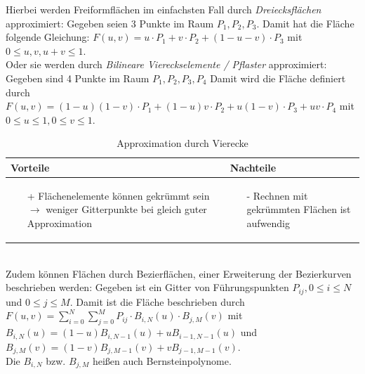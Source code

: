 Hierbei werden Freiformflächen im einfachsten Fall durch \textit{Dreiecksflächen} approximiert:
Gegeben seien 3 Punkte im Raum $P_1 , P_2 , P_3$. Damit hat die Fläche folgende Gleichung:
$F(u,v)=u\cdot P_1 +v\cdot P_2 +(1-u-v)\cdot P_3$ mit $0 \leq u,v, u+v \leq 1$.\\
Oder sie werden durch \textit{Bilineare Viereckselemente / Pflaster} approximiert:
Gegeben sind 4 Punkte im Raum $P_1 , P_2 , P_3, P_4$
Damit wird die Fläche definiert durch $F(u,v)=(1-u)(1-v) \cdot P_1 + (1-u)v \cdot P_2 + u(1-v) \cdot P_3 + uv \cdot P_4$ mit $0 \leq u \leq 1, 0 \leq v \leq 1$. 
\begin{table}[hbt]
\centering
\begin{tabular}{|p{6.5cm}|p{6.5cm}|}
\hline
Vorteile & Nachteile\\
\hline
\vspace{-5mm}
\begin{itemize}
\setlength\itemsep{0em}
\item[+] Flächenelemente können gekrümmt sein
$\rightarrow$ weniger Gitterpunkte bei gleich guter Approximation
\end{itemize}
 &
 \vspace{-5mm}
\begin{itemize}
\setlength\itemsep{0em}
\item[-] Rechnen mit gekrümmten Flächen ist aufwendig
\end{itemize}\\
\hline
\end{tabular}
\caption{Approximation durch Vierecke}
\label{tab:Viereck_approx}
\end{table}\\
Zudem können Flächen durch Bezierflächen, einer Erweiterung der Bezierkurven beschrieben werden: Gegeben ist ein Gitter von Führungspunkten $P_{ij}, 0 \leq i \leq N$ und $0 \leq j \leq M$. Damit ist die Fläche beschrieben durch $F(u,v) = \sum_{i=0}^N \sum_{j=0}^M P_{ij} \cdot B_{i,N}(u) \cdot B_{j,M}(v)$ mit $B_{i,N}(u) = (1-u)B_{i,N-1}(u)+uB_{i-1,N-1}(u)$ und
$B_{j,M}(v) = (1-v)B_{j,M-1}(v)+vB_{j-1,M-1}(v)$.\\ Die $B_{i,N}$ bzw. $B_{j,M}$ heißen auch Bernsteinpolynome.
